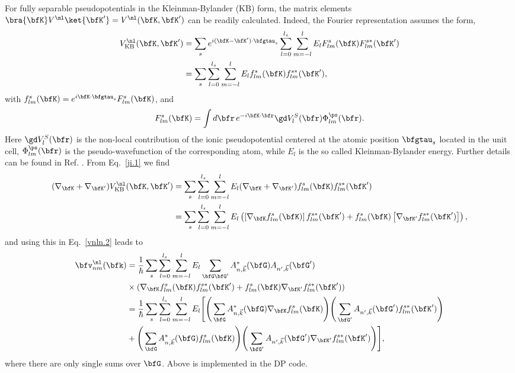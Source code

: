 For fully  separable pseudopotentials in the  
Kleinman-Bylander (KB) form,\cite{mottaCMS10,kleinman_efficacious_1982,adolphPRB96} 
the
matrix elements 
 $\bra{\bfK}
V^\nl
\ket{\bfK'}
=V^\nl(\bfK,\bfK')
$
can be readily calculated. \cite{mottaCMS10}
Indeed,
the Fourier representation assumes 
the form,\cite{adolphPRB96,gordienkoRPJ04,fuchsCPC99}
\begin{align}\label{ji.1} 
V^\nl_{\mathrm{KB}}(\bfK,\bfK')  
 &= 
\sum_s e^{i(\bfK-\bfK')\cdot\bfgtau_s}
\sum_{l=0}^{l_s}\sum_{m=-l}^{l}E_lF_{lm}^s(\bfK)F_{lm}^{s*}(\bfK')  
\nonumber\\
 &= 
\sum_s 
\sum_{l=0}^{l_s}\sum_{m=-l}^{l}E_lf_{lm}^s(\bfK)f_{lm}^{s*}(\bfK')  
,
\end{align} 
with $f^s_{lm}(\bfK)=e^{i\bfK\cdot\bfgtau_s}F^s_{lm}(\bfK)$, and
\begin{align}\label{ji.2}
F^s_{lm}(\bfK)=\int d\bfr\,e^{-i\bfK\cdot\bfr}
\gd V^S_l(\bfr)
\Phi^\ps_{lm}(\bfr) 
.
\end{align}
Here $\gd V^S_l(\bfr)$ is the non-local contribution of the ionic
pseudopotential centered at the atomic position $\bfgtau_s$ located in
the unit cell, 
$\Phi^\ps_{lm}(\bfr)$ is the pseudo-wavefunction of the corresponding
atom, while $E_l$ is the so called 
Kleinman-Bylander energy. Further details can be found in
Ref. \cite{fuchsCPC99}.
From Eq.~\eqref{ji.1} we find
\begin{align}\label{ji.1n}
(\nabla_\bfK+\nabla_{\bfK'})  
V^\nl_{\mathrm{KB}}(\bfK,\bfK') 
 &= 
\sum_s 
\sum_{l=0}^{l_s}\sum_{m=-l}^{l}E_l 
(\nabla_\bfK+\nabla_{\bfK'})   
f_{lm}^s (\bfK)f_{lm}^{s*}(\bfK') 
\nonumber\\
 &= 
\sum_s 
\sum_{l=0}^{l_s}\sum_{m=-l}^{l}E_l 
\left(\left[\nabla_\bfK f_{lm}^s (\bfK)\right]f_{lm}^{s*}(\bfK') 
+
f_{lm}^s (\bfK) \left[\nabla_{\bfK'}  f_{lm}^{s*}(\bfK') \right]
\right),
\end{align}
and using this
 in Eq.~\eqref{vnln.2} leads to
\begin{align}\label{forg}
\bfv^\nl_{nm}(\bfk)
&=
\frac{1}{\hbar}
\sum_s
\sum_{l=0}^{l_s}\sum_{m=-l}^{l}E_l \sum_{\bfG\bfG'}
A^*_{n,\vec{k}}(\bfG)A_{n',\vec{k}}(\bfG')
\nonumber\\
&\times
( \nabla_{\bfK}f_{lm}^s(\bfK)f_{lm}^{s*}(\bfK') +
f_{lm}^s(\bfK)\nabla_{\bfK'}f_{lm}^{s*}(\bfK') ) \nonumber\\
&
=\frac{1}{\hbar}
 \sum_s \sum_{l=0}^{l_s}\sum_{m=-l}^{l}E_l \Bigg[
\Bigg(\sum_{\bfG}A^*_{n,\vec{k}}(\bfG)\nabla_{\bfK}f_{lm}^s(\bfK)\Bigg)
\Bigg(\sum_{\bfG'}A_{n',\vec{k}}(\bfG')
f_{lm}^{s*}(\bfK')\Bigg) \nonumber\\
&+
\Bigg(\sum_{\bfG}A^*_{n,\vec{k}}(\bfG)
f_{lm}^s(\bfK)\Bigg)\Bigg
(\sum_{\bfG'}A_{n',\vec{k}}(\bfG')
\nabla_{\bfK'}f_{lm}^{s*}(\bfK')\Bigg) \Bigg]
,
\end{align}
where there are only single sums over $\bfG$. 
Above is implemented in 
the DP code.\cite{francesco}

